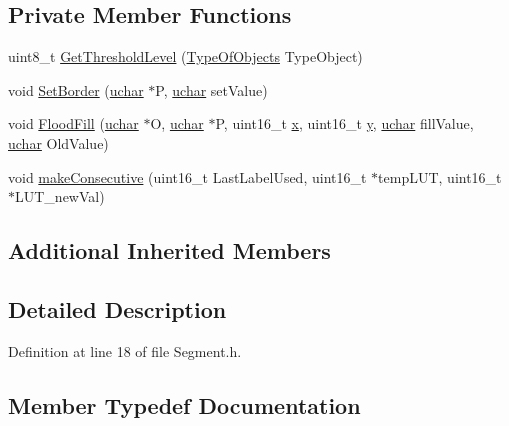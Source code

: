 \subsection*{Private Member Functions}
\begin{DoxyCompactItemize}
\item 
uint8\+\_\+t \hyperlink{class_vision_1_1_segment_a1b15d616db9cbdcd0b07bb267f60895b}{Get\+Threshold\+Level} (\hyperlink{class_vision_1_1_segment_ac3ddf2c72ee6333007510b680db1e7dd}{Type\+Of\+Objects} Type\+Object)
\item 
void \hyperlink{class_vision_1_1_segment_ae3349aa3725f883943fb316c0d52752d}{Set\+Border} (\hyperlink{_soil_math_types_8h_a65f85814a8290f9797005d3b28e7e5fc}{uchar} $\ast$P, \hyperlink{_soil_math_types_8h_a65f85814a8290f9797005d3b28e7e5fc}{uchar} set\+Value)
\item 
void \hyperlink{class_vision_1_1_segment_a62e29f1cc5db86f670c488966a06d644}{Flood\+Fill} (\hyperlink{_soil_math_types_8h_a65f85814a8290f9797005d3b28e7e5fc}{uchar} $\ast$O, \hyperlink{_soil_math_types_8h_a65f85814a8290f9797005d3b28e7e5fc}{uchar} $\ast$P, uint16\+\_\+t \hyperlink{_v_s_a___u_t_2_comparision_pictures_2_createtest_image_8m_a9336ebf25087d91c818ee6e9ec29f8c1}{x}, uint16\+\_\+t \hyperlink{_v_s_a___u_t_2_comparision_pictures_2_createtest_image_8m_a2fb1c5cf58867b5bbc9a1b145a86f3a0}{y}, \hyperlink{_soil_math_types_8h_a65f85814a8290f9797005d3b28e7e5fc}{uchar} fill\+Value, \hyperlink{_soil_math_types_8h_a65f85814a8290f9797005d3b28e7e5fc}{uchar} Old\+Value)
\item 
void \hyperlink{class_vision_1_1_segment_a3543a9696469dc07718c8227eaeaf9c0}{make\+Consecutive} (uint16\+\_\+t Last\+Label\+Used, uint16\+\_\+t $\ast$temp\+L\+U\+T, uint16\+\_\+t $\ast$L\+U\+T\+\_\+new\+Val)
\end{DoxyCompactItemize}
\subsection*{Additional Inherited Members}


\subsection{Detailed Description}


Definition at line 18 of file Segment.\+h.



\subsection{Member Typedef Documentation}
\hypertarget{class_vision_1_1_segment_add6c81230e499b159218c5232e3b76ae}{}
